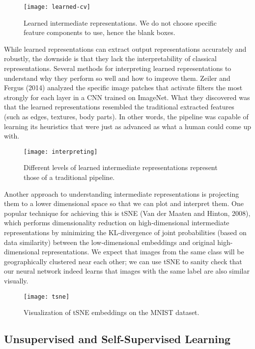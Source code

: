 \documentclass[12pt]{article}
\begin{document}
\begin{figure}[H]
  \caption{Learned intermediate representations. We do not choose specific feature components to use, hence the blank boxes.}
  \centering
\texttt{[image: learned-cv]}
\end{figure}

While learned representations can extract output representations accurately and robustly, the downside is that they lack the interpretability of classical representations. Several methods for interpreting learned representations to understand why they perform so well and how to improve them. Zeiler and Fergus (2014) analyzed the specific image patches that activate filters the most strongly for each layer in a CNN trained on ImageNet. What they discovered was that the learned representations resembled the traditional extracted features (such as edges, textures, body parts). In other words, the pipeline was capable of learning its heuristics that were just as advanced as what a human could come up with.

\begin{figure}[H]
  \caption{Different levels of learned intermediate representations represent those of a traditional pipeline.}
  \centering
\texttt{[image: interpreting]}
\end{figure}

Another approach to understanding intermediate representations is projecting them to a lower dimensional space so that we can plot and interpret them. One popular technique for achieving this is tSNE (Van der Maaten and Hinton, 2008), which performs dimensionality reduction on high-dimensional intermediate representations by minimizing the KL-divergence of joint probabilities (based on data similarity) between the low-dimensional embeddings and original high-dimensional representations. We expect that images from the same class will be geographically clustered near each other; we can use tSNE to sanity check that our neural network indeed learns that images with the same label are also similar visually.
 
\begin{figure}[H]
  \caption{Visualization of tSNE embeddings on the MNIST dataset.}
  \centering
\texttt{[image: tsne]}
\end{figure}

\subsection*{Unsupervised and Self-Supervised Learning}
\end{document}
